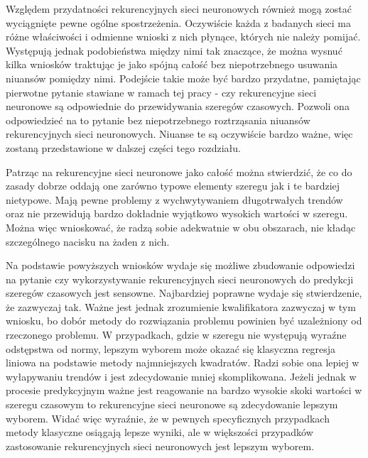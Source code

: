 \documentclass[10pt,a4paper]{article}
\begin{document}
Względem przydatności rekurencyjnych sieci neuronowych również mogą zostać wyciągnięte pewne ogólne spostrzeżenia. Oczywiście każda z badanych sieci ma różne właściwości i odmienne wnioski z nich płynące, których nie należy pomijać. Występują jednak podobieństwa między nimi tak znaczące, że można wysnuć kilka wniosków traktując je jako spójną całość bez niepotrzebnego usuwania niuansów pomiędzy nimi. Podejście takie może być bardzo przydatne, pamiętając pierwotne pytanie stawiane w ramach tej pracy - czy rekurencyjne sieci neuronowe są odpowiednie do przewidywania szeregów czasowych. Pozwoli ona odpowiedzieć na to pytanie bez niepotrzebnego roztrząsania niuansów rekurencyjnych sieci neuronowych. Niuanse te są oczywiście bardzo ważne, więc zostaną przedstawione w dalszej części tego rozdziału.

Patrząc na rekurencyjne sieci neuronowe jako całość można stwierdzić, że co do zasady dobrze oddają one zarówno typowe elementy szeregu jak i te bardziej nietypowe. Mają pewne problemy z wychwytywaniem długotrwałych trendów oraz nie przewidują bardzo dokładnie wyjątkowo wysokich wartości w szeregu. Można więc wnioskować, że radzą sobie adekwatnie w obu obszarach, nie kładąc szczególnego nacisku na żaden z nich. 

Na podstawie powyższych wniosków wydaje się możliwe zbudowanie odpowiedzi na pytanie czy wykorzystywanie rekurencyjnych sieci neuronowych do predykcji szeregów czasowych jest sensowne. Najbardziej poprawne wydaje się stwierdzenie, że zazwyczaj tak. Ważne jest jednak zrozumienie kwalifikatora zazwyczaj w tym wniosku, bo dobór metody do rozwiązania problemu powinien być uzależniony od rzeczonego problemu. W przypadkach, gdzie w szeregu nie występują wyraźne odstępstwa od normy, lepszym wyborem może okazać się klasyczna regresja liniowa na podstawie metody najmniejszych kwadratów. Radzi sobie ona lepiej w wyłapywaniu trendów i jest zdecydowanie mniej skomplikowana. Jeżeli jednak w procesie predykcyjnym ważne jest reagowanie na bardzo wysokie skoki wartości w szeregu czasowym to rekurencyjne sieci neuronowe są zdecydowanie lepszym wyborem. Widać więc wyraźnie, że w pewnych specyficznych przypadkach metody klasyczne osiągają lepsze wyniki, ale w większości przypadków zastosowanie rekurencyjnych sieci neuronowych jest lepszym wyborem. 
\end{document}
